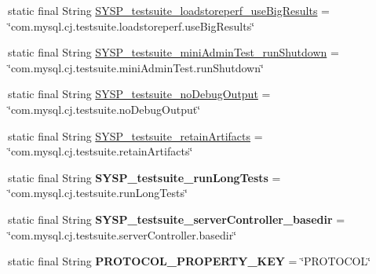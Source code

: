 \begin{DoxyCompactItemize}
\item 
static final String \mbox{\hyperlink{classcom_1_1mysql_1_1cj_1_1conf_1_1_property_definitions_a9f10b1012a4ea03e4b680add5d6bd700}{S\+Y\+S\+P\+\_\+testsuite\+\_\+loadstoreperf\+\_\+use\+Big\+Results}} = \char`\"{}com.\+mysql.\+cj.\+testsuite.\+loadstoreperf.\+use\+Big\+Results\char`\"{}
\item 
static final String \mbox{\hyperlink{classcom_1_1mysql_1_1cj_1_1conf_1_1_property_definitions_a53831bb7eefb09a7489e8d70576f91c5}{S\+Y\+S\+P\+\_\+testsuite\+\_\+mini\+Admin\+Test\+\_\+run\+Shutdown}} = \char`\"{}com.\+mysql.\+cj.\+testsuite.\+mini\+Admin\+Test.\+run\+Shutdown\char`\"{}
\item 
static final String \mbox{\hyperlink{classcom_1_1mysql_1_1cj_1_1conf_1_1_property_definitions_abd7660a7281ae9d5070760e1b69769a3}{S\+Y\+S\+P\+\_\+testsuite\+\_\+no\+Debug\+Output}} = \char`\"{}com.\+mysql.\+cj.\+testsuite.\+no\+Debug\+Output\char`\"{}
\item 
static final String \mbox{\hyperlink{classcom_1_1mysql_1_1cj_1_1conf_1_1_property_definitions_ac945001cda21055ae2127bf8f5fad45d}{S\+Y\+S\+P\+\_\+testsuite\+\_\+retain\+Artifacts}} = \char`\"{}com.\+mysql.\+cj.\+testsuite.\+retain\+Artifacts\char`\"{}
\item 
\mbox{\label{classcom_1_1mysql_1_1cj_1_1conf_1_1_property_definitions_acc468685036d517e9e596f67d637b781}} 
static final String {\bfseries S\+Y\+S\+P\+\_\+testsuite\+\_\+run\+Long\+Tests} = \char`\"{}com.\+mysql.\+cj.\+testsuite.\+run\+Long\+Tests\char`\"{}
\item 
\mbox{\label{classcom_1_1mysql_1_1cj_1_1conf_1_1_property_definitions_a4f8ef158fd6ec92b5282565006818f69}} 
static final String {\bfseries S\+Y\+S\+P\+\_\+testsuite\+\_\+server\+Controller\+\_\+basedir} = \char`\"{}com.\+mysql.\+cj.\+testsuite.\+server\+Controller.\+basedir\char`\"{}
\item 
\mbox{\label{classcom_1_1mysql_1_1cj_1_1conf_1_1_property_definitions_ade155de50dcfc803641118d79a9ea9ff}} 
static final String {\bfseries P\+R\+O\+T\+O\+C\+O\+L\+\_\+\+P\+R\+O\+P\+E\+R\+T\+Y\+\_\+\+K\+EY} = \char`\"{}P\+R\+O\+T\+O\+C\+OL\char`\"{}
\item 
\mbox{\label{classcom_1_1mysql_1_1cj_1_1conf_1_1_property_definitions_a15ada3c5b5211c8a7a37ed2b902defb4}} 

\end{DoxyCompactItemize}
